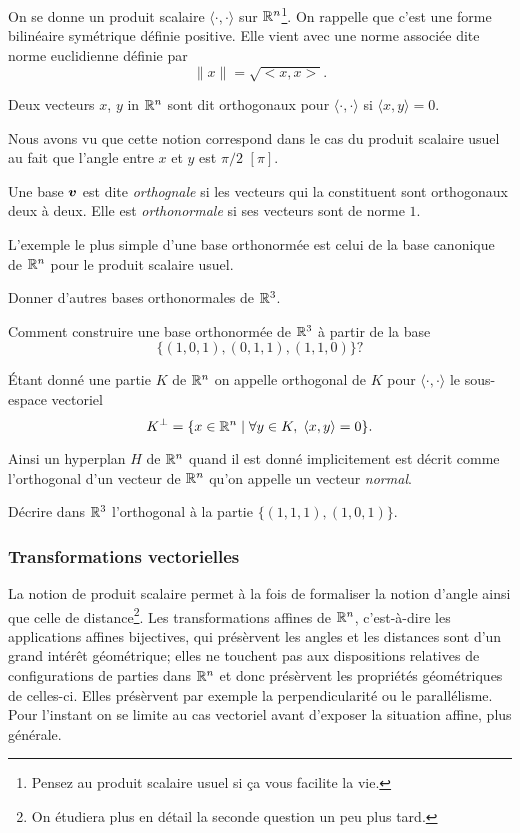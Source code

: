 \documentclass[11pt, a4paper]{article}
\begin{document}
On se donne un produit scalaire $\langle \cdot, \cdot \rangle$ sur
$\mathbb{R}^n$\footnote{Pensez au produit scalaire usuel si \c{c}a vous
  facilite la vie.}. On rappelle que c'est une forme bilinéaire
symétrique définie positive. Elle vient avec une norme associée dite
norme euclidienne définie par
\[
\|x\| = \sqrt{<x, x>}.
\]
\begin{defn}
  Deux vecteurs $x$, $y$ in $\mathbb{R}^n$ sont dit orthogonaux pour
  $\langle \cdot, \cdot \rangle$ si $\langle x, y \rangle = 0$.
\end{defn}
\noindent Nous avons vu que cette notion correspond dans le cas du
produit scalaire usuel au fait que l'angle entre $x$ et $y$ est
$\pi/2$ $[\pi]$.
\begin{defn}
  Une base $\boldsymbol{v}$ est dite \emph{orthognale} si les vecteurs qui la
  constituent sont orthogonaux deux à deux. Elle est
  \emph{orthonormale} si ses vecteurs sont de norme $1$.
\end{defn}
\noindent L'exemple le plus simple d'une base orthonormée est celui de
la base canonique de $\mathbb{R}^n$ pour le produit scalaire usuel.
\begin{question}
  Donner d'autres bases orthonormales de $\mathbb{R}^3$.
\end{question}
\begin{question}
  Comment construire une base orthonormée de $\mathbb{R}^3$ à partir de la
  base
  \[
  \{(1, 0, 1), (0, 1, 1), (1, 1, 0)\}?
  \]
\end{question}
\begin{defn}
  Étant donné une partie $K$ de $\mathbb{R}^n$ on appelle orthogonal de $K$
  pour $\langle \cdot, \cdot \rangle$ le sous-espace vectoriel
  \[
  K^\perp = \{ x \in \mathbb{R}^n \mid \forall y \in K, \; \langle x, y \rangle = 0 \}.
  \]
\end{defn}
\noindent Ainsi un hyperplan $H$ de $\mathbb{R}^n$ quand il est donné implicitement est
décrit comme l'orthogonal d'un vecteur de $\mathbb{R}^n$ qu'on appelle un
vecteur \emph{normal}.
\begin{question}
  Décrire dans $\mathbb{R}^3$ l'orthogonal à la partie $\{(1, 1, 1), (1, 0, 1)\}$.
\end{question}

\subsubsection{Transformations vectorielles}

La notion de produit scalaire permet à la fois de formaliser la notion
d'angle ainsi que celle de distance\footnote{On étudiera plus en
  détail la seconde question un peu plus tard.}. Les transformations
affines de $\mathbb{R}^n$, c'est-à-dire les applications affines bijectives,
qui présèrvent les angles et les distances sont d'un grand intérêt
géométrique; elles ne touchent pas aux dispositions relatives de
configurations de parties dans $\mathbb{R}^n$ et donc présèrvent les
propriétés géométriques de celles-ci. Elles présèrvent par exemple la
perpendicularité ou le parallélisme. Pour l'instant on se limite au
cas vectoriel avant d'exposer la situation affine, plus générale.
\end{document}
